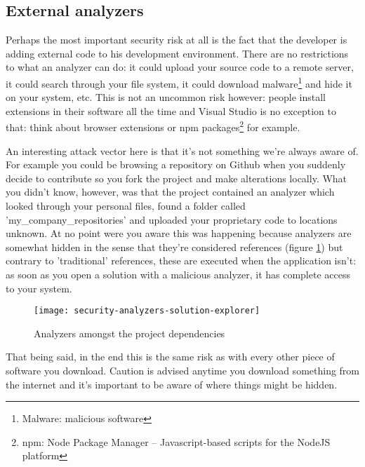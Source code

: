 \subsection{External analyzers}
\label{sec:security-external-analyzers}

Perhaps the most important security risk at all is the fact that the developer is adding external code to his development environment. There are no restrictions to what an analyzer can do: it could upload your source code to a remote server, it could search through your file system, it could download \gls{malware}\footnote{Malware: malicious software} and hide it on your system, etc. This is not an uncommon risk however: people install extensions in their software all the time and Visual Studio is no exception to that: think about browser extensions or \gls{npm} packages\footnote{npm: Node Package Manager -- Javascript-based scripts for the NodeJS platform} for example. 

An interesting attack vector here is that it's not something we're always aware of. For example you could be browsing a repository on Github when you suddenly decide to contribute so you \gls{fork} the project and make alterations locally. What you didn't know, however, was that the project contained an analyzer which looked through your personal files, found a folder called 'my\_company\_repositories' and uploaded your proprietary code to locations unknown. At no point were you aware this was happening because analyzers are somewhat hidden in the sense that they're considered references (figure \ref{img:security-analyzers-solution-explorer}) but contrary to 'traditional' references, these are executed when the application isn't: as soon as you open a solution with a malicious analyzer, it has complete access to your system.

\begin{figure}[H]
\centering
\texttt{[image: security-analyzers-solution-explorer]}
\caption[Analyzers amongst the project dependencies]{Analyzers amongst the project dependencies}
\label{img:security-analyzers-solution-explorer}
\end{figure}

That being said, in the end this is the same risk as with every other piece of software you download. Caution is advised anytime you download something from the internet and it's important to be aware of where things might be hidden.
